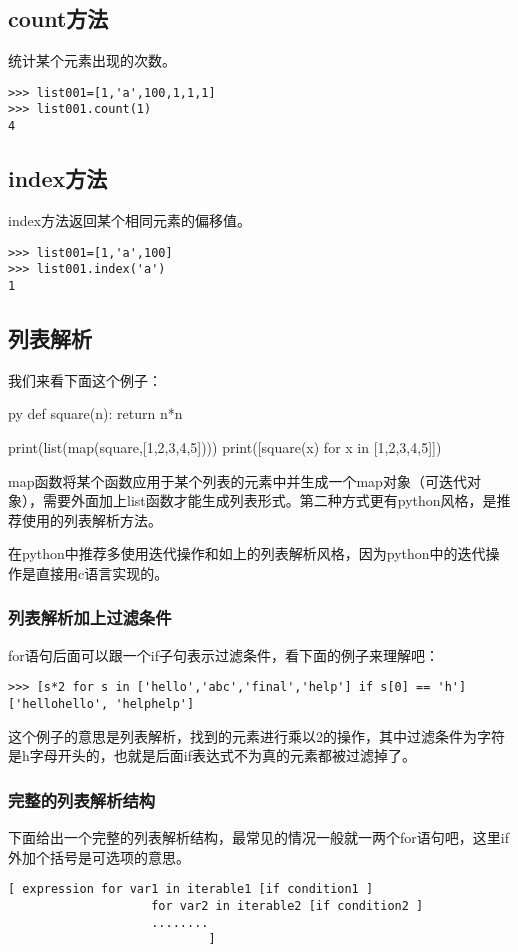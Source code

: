 \documentclass[12pt,oneside]{book}
\begin{document}
\begin{common-format}
\subsection{count方法}
统计某个元素出现的次数。
\begin{Verbatim}
>>> list001=[1,'a',100,1,1,1]
>>> list001.count(1)
4
\end{Verbatim}


\subsection{index方法}
index方法返回某个相同元素的偏移值。
\begin{Verbatim}
>>> list001=[1,'a',100]
>>> list001.index('a')
1
\end{Verbatim}


\subsection{列表解析}
\label{sec:列表解析}
我们来看下面这个例子：
\begin{xverbatim}[129]{py}
def square(n):
    return n*n
    
print(list(map(square,[1,2,3,4,5])))
print([square(x) for x in [1,2,3,4,5]])
\end{xverbatim}
map函数将某个函数应用于某个列表的元素中并生成一个map对象（可迭代对象），需要外面加上list函数才能生成列表形式。第二种方式更有python风格，是推荐使用的列表解析方法。

在python中推荐多使用迭代操作和如上的列表解析风格，因为python中的迭代操作是直接用c语言实现的。

\subsubsection{列表解析加上过滤条件}
for语句后面可以跟一个if子句表示过滤条件，看下面的例子来理解吧：
\begin{Verbatim}
>>> [s*2 for s in ['hello','abc','final','help'] if s[0] == 'h']
['hellohello', 'helphelp']
\end{Verbatim}

这个例子的意思是列表解析，找到的元素进行乘以2的操作，其中过滤条件为字符是h字母开头的，也就是后面if表达式不为真的元素都被过滤掉了。


\subsubsection{完整的列表解析结构}
下面给出一个完整的列表解析结构，最常见的情况一般就一两个for语句吧，这里if外加个括号是可选项的意思。
\begin{Verbatim}
[ expression for var1 in iterable1 [if condition1 ]
                    for var2 in iterable2 [if condition2 ]
                    ........
                            ]
\end{Verbatim}


\end{common-format}
\end{document}
